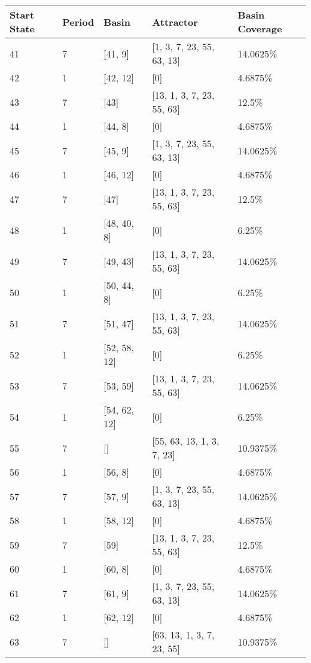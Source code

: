 \documentclass[10pt,a4paper]{article}
\begin{document}
\begin{enumerate}
\begin{table}[H]
	\centering
	\begin{tabular}{|l|l|l|l|l|}
		\hline
		\textbf{Start State} & \textbf{Period} & \textbf{Basin} & \textbf{Attractor} & \textbf{Basin Coverage} \\ \hline
		41 & 7 & [41, 9] & [1, 3, 7, 23, 55, 63, 13] & 14.0625\%\\ \hline 
		42 & 1 & [42, 12] & [0] & 4.6875\%\\ \hline 
		43 & 7 & [43] & [13, 1, 3, 7, 23, 55, 63] & 12.5\%\\ \hline 
		44 & 1 & [44, 8] & [0] & 4.6875\%\\ \hline 
		45 & 7 & [45, 9] & [1, 3, 7, 23, 55, 63, 13] & 14.0625\%\\ \hline 
		46 & 1 & [46, 12] & [0] & 4.6875\%\\ \hline 
		47 & 7 & [47] & [13, 1, 3, 7, 23, 55, 63] & 12.5\%\\ \hline 
		48 & 1 & [48, 40, 8] & [0] & 6.25\%\\ \hline 
		49 & 7 & [49, 43] & [13, 1, 3, 7, 23, 55, 63] & 14.0625\%\\ \hline 
		50 & 1 & [50, 44, 8] & [0] & 6.25\%\\ \hline 
		51 & 7 & [51, 47] & [13, 1, 3, 7, 23, 55, 63] & 14.0625\%\\ \hline 
		52 & 1 & [52, 58, 12] & [0] & 6.25\%\\ \hline 
		53 & 7 & [53, 59] & [13, 1, 3, 7, 23, 55, 63] & 14.0625\%\\ \hline 
		54 & 1 & [54, 62, 12] & [0] & 6.25\%\\ \hline 
		55 & 7 & [] & [55, 63, 13, 1, 3, 7, 23] & 10.9375\%\\ \hline 
		56 & 1 & [56, 8] & [0] & 4.6875\%\\ \hline 
		57 & 7 & [57, 9] & [1, 3, 7, 23, 55, 63, 13] & 14.0625\%\\ \hline 
		58 & 1 & [58, 12] & [0] & 4.6875\%\\ \hline 
		59 & 7 & [59] & [13, 1, 3, 7, 23, 55, 63] & 12.5\%\\ \hline 
		60 & 1 & [60, 8] & [0] & 4.6875\%\\ \hline 
		61 & 7 & [61, 9] & [1, 3, 7, 23, 55, 63, 13] & 14.0625\%\\ \hline 
		62 & 1 & [62, 12] & [0] & 4.6875\%\\ \hline 
		63 & 7 & [] & [63, 13, 1, 3, 7, 23, 55] & 10.9375\%\\ \hline 
		
		
	\end{tabular}
\end{table}




\end{enumerate}
\end{document}
